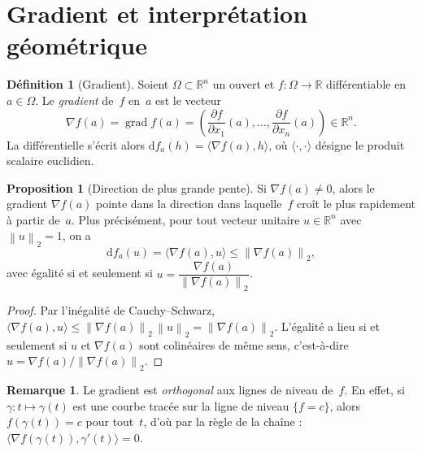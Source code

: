 \documentclass[12pt,a4paper,openany]{book}
\theoremstyle{definition}
\newtheorem{definition}{Définition}[chapter]
\newtheorem{proposition}{Proposition}[chapter]
\newtheorem{remarque}{Remarque}[chapter]
\newcommand{\R}{\mathbb{R}}
\newcommand{\norm}[1]{\left\lVert #1 \right\rVert}
\newcommand{\dd}{\mathrm{d}}
\begin{document}
\section{Gradient et interprétation géométrique}
\label{sec:gradient}

\begin{definition}[Gradient]\label{def:gradient}
  Soient $\Omega \subset \R^n$ un ouvert et $f \colon \Omega \to \R$ différentiable en $a \in \Omega$. Le \emph{gradient} de~$f$ en~$a$ est le vecteur
  \[
    \nabla f(a) = \operatorname{grad} f(a) = \left(\frac{\partial f}{\partial x_1}(a), \ldots, \frac{\partial f}{\partial x_n}(a)\right) \in \R^n.
  \]
  La différentielle s'écrit alors $\dd f_a(h) = \langle \nabla f(a), h \rangle$, où $\langle \cdot, \cdot \rangle$ désigne le produit scalaire euclidien.
\end{definition}

\begin{proposition}[Direction de plus grande pente]
  \label{prop:gradient-direction}
  Si $\nabla f(a) \neq 0$, alors le gradient $\nabla f(a)$ pointe dans la direction dans laquelle~$f$ croît le plus rapidement à partir de~$a$. Plus précisément, pour tout vecteur unitaire $u \in \R^n$ avec $\norm{u}_2 = 1$, on a
  \[
    \dd f_a(u) = \langle \nabla f(a), u \rangle \leqslant \norm{\nabla f(a)}_2,
  \]
  avec égalité si et seulement si $u = \dfrac{\nabla f(a)}{\norm{\nabla f(a)}_2}$.
\end{proposition}

\begin{proof}
  Par l'inégalité de Cauchy--Schwarz, $\langle \nabla f(a), u \rangle \leqslant \norm{\nabla f(a)}_2 \, \norm{u}_2 = \norm{\nabla f(a)}_2$. L'égalité a lieu si et seulement si $u$ et $\nabla f(a)$ sont colinéaires de même sens, c'est-à-dire $u = \nabla f(a) / \norm{\nabla f(a)}_2$.
\end{proof}

\begin{remarque}
  \label{rem:gradient-orthogonal-lignes-niveau}
  Le gradient est \emph{orthogonal} aux lignes de niveau de~$f$. En effet, si $\gamma \colon t \mapsto \gamma(t)$ est une courbe tracée sur la ligne de niveau $\{f = c\}$, alors $f(\gamma(t)) = c$ pour tout~$t$, d'où par la règle de la chaîne : $\langle \nabla f(\gamma(t)), \gamma'(t) \rangle = 0$.
\end{remarque}
\end{document}
